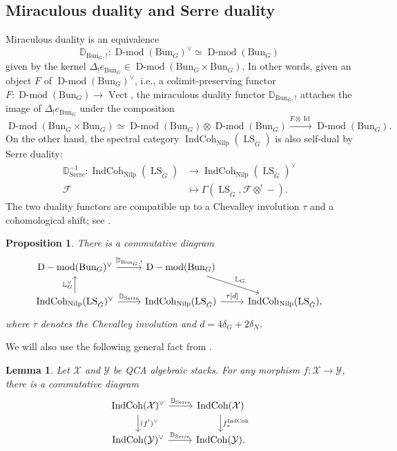 \documentclass[11pt]{amsart}
\newcommand{\cF}{\mathcal{F}}
\newcommand{\Vect}{\operatorname{Vect}}
\newcommand{\Bun}{{\mathrm{Bun}}}
\newcommand{\Nilp}{\mathrm{Nilp}}
\DeclareMathOperator{\Dmod}{D-mod}
\DeclareMathOperator{\IndCoh}{IndCoh}
\DeclareMathOperator{\LS}{LS}
\newtheorem{lemma}[thm]{Lemma}
\newtheorem{prop}[thm]{Proposition}
\theoremstyle{remark}
\theoremstyle{definition}
\begin{document}
\subsection{Miraculous duality and Serre duality}\label{subsec:duality} 
Miraculous duality \cite{miraculous-duality,compact-generation} is an equivalence\[
\mathbb D_{\Bun_G,!}\colon\Dmod(\Bun_G)^\vee\simeq\Dmod(\Bun_G)
\]
given by the kernel $\Delta_!e_{\Bun_G}\in\Dmod(\Bun_G\times\Bun_G)$.
In other words, given an object $F$ of $\Dmod(\Bun_G)^\vee$, i.e., a colimit-preserving functor $F\colon\Dmod(\Bun_G)\to\Vect$, the miraculous duality functor $\mathbb D_{\Bun_G,!}$ attaches the image of $\Delta_!e_{\Bun_G}$ under the composition
\[
\Dmod(\Bun_G\times\Bun_G)\simeq\Dmod(\Bun_G)\otimes\Dmod(\Bun_G)\xrightarrow{F\otimes\operatorname{Id}}\Dmod(\Bun_G).
\]
On the other hand, the spectral category $\IndCoh_\Nilp(\LS_{\check G})$ is also self-dual by Serre duality:
\begin{align*}
\mathbb D_{\mathrm{Serre}}^{-1}\colon\IndCoh_\Nilp(\LS_{\check G})&\to \IndCoh_\Nilp(\LS_{\check G})^\vee\\
\cF&\mapsto\Gamma(\LS_{\check G},\cF\otimes^!-).
\end{align*}
The two duality functors are compatible up to a Chevalley involution $\tau$ and a cohomological shift; see \cite[\S1.1.8]{kevin}.
\begin{prop}
\label{lem:duality-intertwined}
    There is a commutative diagram
    \[
    \begin{tikzcd}
        \Dmod(\Bun_G)^\vee\arrow{r}{\mathbb D_{\Bun_G,!}}&\Dmod(\Bun_G)\arrow{dr}{\mathbb L_G}\\
        \IndCoh_\Nilp(\LS_{\check G})^\vee\arrow{r}{\mathbb D_{\mathrm{Serre}}}\arrow{u}{\mathbb L_G^\vee}&\IndCoh_\Nilp(\LS_{\check G})\arrow{r}{\tau[d]}&\IndCoh_\Nilp(\LS_{\check G}),
    \end{tikzcd}
    \]
    where $\tau$ denotes the Chevalley involution and $d=4\delta_G+2\delta_N$. 
\end{prop}
We will also use the following general fact from \cite[Proposition~4.4.11]{finiteness}.
\begin{lemma}\label{lem:serre-duality}
    Let $\mathcal X$ and $\mathcal Y$ be QCA algebraic stacks. For any morphism $f\colon\mathcal X\to\mathcal Y$, there is a commutative diagram
    \[
    \begin{tikzcd}
        \IndCoh(\mathcal X)^\vee\arrow{r}{\mathbb D_{\mathrm{Serre}}}\arrow{d}{(f^!)^\vee}&\IndCoh(\mathcal X)\arrow{d}{f_*^{\IndCoh}}\\
        \IndCoh(\mathcal Y)^\vee\arrow{r}{\mathbb D_{\mathrm{Serre}}}&\IndCoh(\mathcal Y).
    \end{tikzcd}
    \]
\end{lemma}
\end{document}
